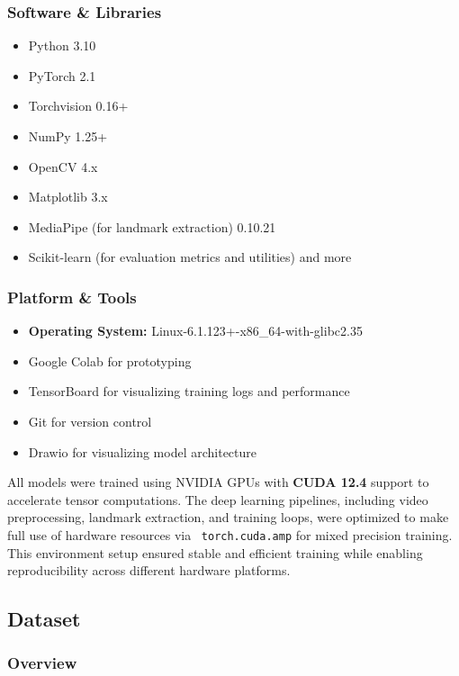 \documentclass{article}
\begin{document}
\subsubsection*{Software \& Libraries}
\begin{itemize}
  \item Python 3.10
  \item PyTorch 2.1
  \item Torchvision 0.16+
  \item NumPy 1.25+
  \item OpenCV 4.x
  \item Matplotlib 3.x
  \item MediaPipe (for landmark extraction) 0.10.21
  \item Scikit-learn (for evaluation metrics and utilities) and more
\end{itemize}

\subsubsection*{Platform \& Tools}
\begin{itemize}
  \item \textbf{Operating System:} Linux-6.1.123+-x86\_64-with-glibc2.35
  \item Google Colab for prototyping
  \item TensorBoard for visualizing training logs and performance
  \item Git for version control
  \item Drawio for visualizing model architecture
\end{itemize}

All models were trained using NVIDIA GPUs with \textbf{CUDA 12.4} support to accelerate tensor computations. The deep learning pipelines, including video preprocessing, landmark extraction, and training loops, were optimized to make full use of hardware resources via \
\texttt{torch.cuda.amp} for mixed precision training. This environment setup ensured stable and efficient training while enabling reproducibility across different hardware platforms.

\subsection{Dataset}
\subsubsection{Overview}
\end{document}
